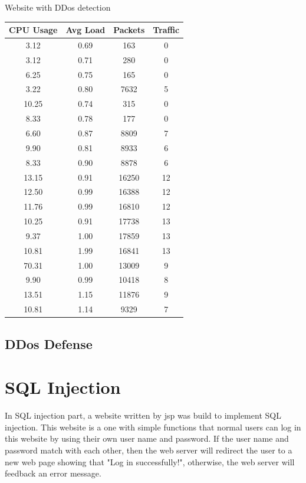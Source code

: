 \documentclass[12pt]{article}
\begin{document}
\begin{minipage}{.60\textwidth}
\centering
\caption{Website with DDos detection}
\begin{tabular}{|c|c|c|c|}
\hline
  CPU Usage & Avg Load & Packets & Traffic
 \\
  \hline
  3.12 & 0.69 & 163 & 0 \\
  3.12 & 0.71 & 280 & 0\\
  6.25 & 0.75 & 165 & 0\\
  3.22 & 0.80 & 7632 & 5\\
 10.25 & 0.74 & 315 & 0\\
  8.33 & 0.78 & 177 & 0\\
  6.60 & 0.87 & 8809 & 7\\
  9.90 & 0.81 & 8933 & 6\\
  8.33 & 0.90 & 8878 & 6\\
 13.15 & 0.91 & 16250 & 12\\
 12.50 & 0.99 & 16388 & 12\\
 11.76 & 0.99 & 16810 & 12\\
 10.25 & 0.91 & 17738 & 13\\
  9.37 & 1.00 & 17859 & 13\\
 10.81 & 1.99 & 16841 & 13\\
 70.31 & 1.00 & 13009 & 9\\
  9.90 & 0.99 & 10418 & 8\\
 13.51 & 1.15 & 11876 & 9\\
 10.81 & 1.14 & 9329 & 7\\
    \hline
\end{tabular}

\end{minipage}
\subsection{DDos Defense}


\newpage
\section{SQL Injection}

In SQL injection part, a website written by jsp was build to implement SQL injection. This website is a one with simple functions that normal users can log in this website by using their own user name and password. If the user name and password match with each other, then the web server will redirect the user to a new web page showing that "Log in successfully!", otherwise, the web server will feedback an error message.\\
\end{document}
